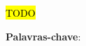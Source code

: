 \setlength{\absparsep}{18pt} %
\begin{resumo}
    \hl{TODO} %
    
    \vspace{\onelineskip}

    \noindent 
    \textbf{Palavras-chave}: 
\end{resumo}